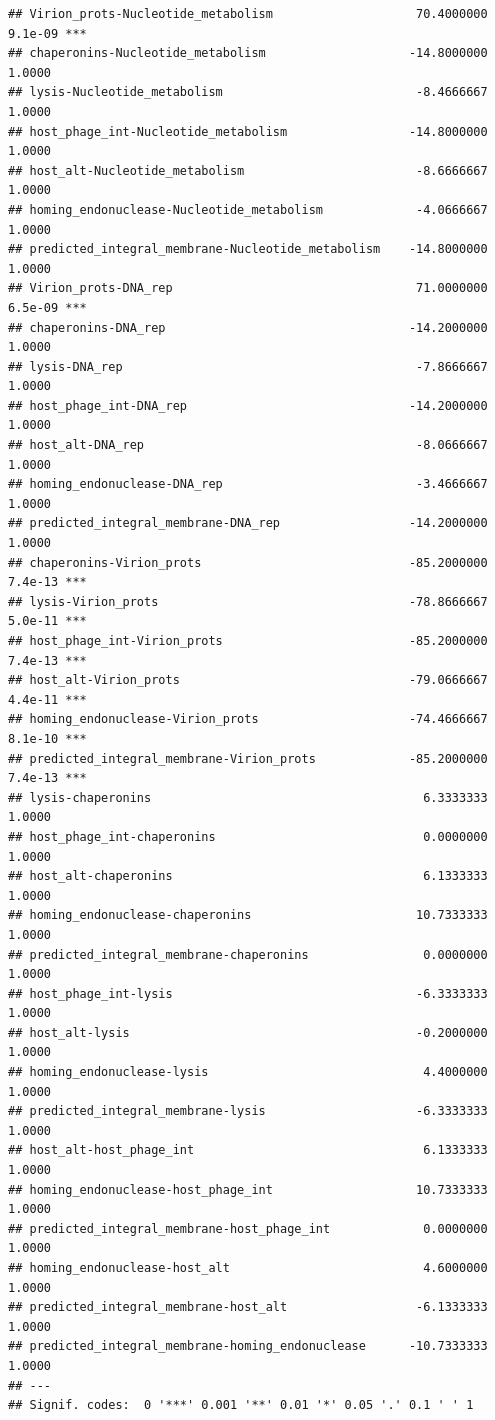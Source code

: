 \documentclass[
]{article}
\begin{document}
\begin{verbatim}
## Virion_prots-Nucleotide_metabolism                    70.4000000 9.1e-09 ***
## chaperonins-Nucleotide_metabolism                    -14.8000000  1.0000    
## lysis-Nucleotide_metabolism                           -8.4666667  1.0000    
## host_phage_int-Nucleotide_metabolism                 -14.8000000  1.0000    
## host_alt-Nucleotide_metabolism                        -8.6666667  1.0000    
## homing_endonuclease-Nucleotide_metabolism             -4.0666667  1.0000    
## predicted_integral_membrane-Nucleotide_metabolism    -14.8000000  1.0000    
## Virion_prots-DNA_rep                                  71.0000000 6.5e-09 ***
## chaperonins-DNA_rep                                  -14.2000000  1.0000    
## lysis-DNA_rep                                         -7.8666667  1.0000    
## host_phage_int-DNA_rep                               -14.2000000  1.0000    
## host_alt-DNA_rep                                      -8.0666667  1.0000    
## homing_endonuclease-DNA_rep                           -3.4666667  1.0000    
## predicted_integral_membrane-DNA_rep                  -14.2000000  1.0000    
## chaperonins-Virion_prots                             -85.2000000 7.4e-13 ***
## lysis-Virion_prots                                   -78.8666667 5.0e-11 ***
## host_phage_int-Virion_prots                          -85.2000000 7.4e-13 ***
## host_alt-Virion_prots                                -79.0666667 4.4e-11 ***
## homing_endonuclease-Virion_prots                     -74.4666667 8.1e-10 ***
## predicted_integral_membrane-Virion_prots             -85.2000000 7.4e-13 ***
## lysis-chaperonins                                      6.3333333  1.0000    
## host_phage_int-chaperonins                             0.0000000  1.0000    
## host_alt-chaperonins                                   6.1333333  1.0000    
## homing_endonuclease-chaperonins                       10.7333333  1.0000    
## predicted_integral_membrane-chaperonins                0.0000000  1.0000    
## host_phage_int-lysis                                  -6.3333333  1.0000    
## host_alt-lysis                                        -0.2000000  1.0000    
## homing_endonuclease-lysis                              4.4000000  1.0000    
## predicted_integral_membrane-lysis                     -6.3333333  1.0000    
## host_alt-host_phage_int                                6.1333333  1.0000    
## homing_endonuclease-host_phage_int                    10.7333333  1.0000    
## predicted_integral_membrane-host_phage_int             0.0000000  1.0000    
## homing_endonuclease-host_alt                           4.6000000  1.0000    
## predicted_integral_membrane-host_alt                  -6.1333333  1.0000    
## predicted_integral_membrane-homing_endonuclease      -10.7333333  1.0000    
## ---
## Signif. codes:  0 '***' 0.001 '**' 0.01 '*' 0.05 '.' 0.1 ' ' 1
\end{verbatim}
\end{document}
